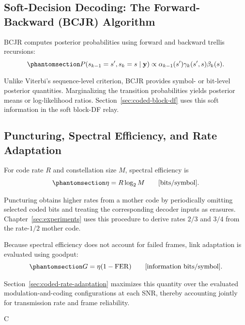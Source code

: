\subsection{Soft-Decision Decoding: The Forward-Backward (BCJR) Algorithm}\label{sec:soft-decision-bcjr-decoding}

BCJR \cite{BahlCockeJelinekRaviv1974BCJR} computes posterior probabilities using forward and backward trellis recursions:
\begin{equation}\protect\phantomsection\label{eq:bcjr-posterior}
P(s_{k-1}=s',s_k=s\mid\mathbf{y})
\propto
\alpha_{k-1}(s')
\gamma_k(s',s)
\beta_k(s).
\end{equation}

Unlike Viterbi's sequence-level criterion, BCJR provides symbol- or bit-level posterior quantities. Marginalizing the transition probabilities yields posterior means or log-likelihood ratios. Section~\ref{sec:coded-block-df} uses this soft information in the soft block-DF relay.

\subsection{Puncturing, Spectral Efficiency, and Rate Adaptation}\label{sec:puncturing-spectral-efficiency}

For code rate \(R\) and constellation size \(M\), spectral efficiency is \cite{ProakisSalehi2008DigitalComm}
\begin{equation}\protect\phantomsection\label{eq:spectral-efficiency}
\eta
=
R\log_2M
\qquad
\text{[bits/symbol]}.
\end{equation}

Puncturing obtains higher rates from a mother code by periodically omitting selected coded bits and treating the corresponding decoder inputs as erasures. Chapter~\ref{sec:experiments} uses this procedure to derive rates \(2/3\) and \(3/4\) from the rate-\(1/2\) mother code.

Because spectral efficiency does not account for failed frames, link adaptation is evaluated using goodput:
\begin{equation}\protect\phantomsection\label{eq:goodput}
G
=
\eta(1-\mathrm{FER})
\qquad
\text{[information bits/symbol]}.
\end{equation}

Section~\ref{sec:coded-rate-adaptation} maximizes this quantity over the evaluated modulation-and-coding configurations at each SNR, thereby accounting jointly for transmission rate and frame reliability.

C